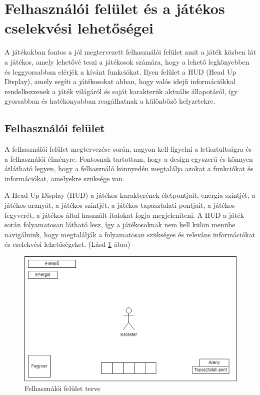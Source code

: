 \section{Felhasználói felület és a játékos cselekvési lehetőségei}

 A játékokban fontos a jól megtervezett felhasználói felület amit a játék közben lát a játékos, amely lehetővé teszi a játékosok számára, hogy a lehető legkönyebben és leggyorsabban elérjék a kívánt funkciókat. Ilyen felület a HUD (Head Up Display), amely segíti a játékosokat abban, hogy valós idejű információkkal rendelkezzenek a játék világáról és saját karakterük aktuális állapotáról, így gyorsabban és hatékonyabban reagálhatnak a különböző helyzetekre.


\subsection{Felhasználói felület}

 A felhasználói felület megtervezése során, nagyon kell figyelni a letisztultságra és a felhasználói élményre. Fontosnak tartottam, hogy a design egyszerű és könnyen átlátható legyen, hogy a felhasználó könnyedén megtalálja azokat a funkciókat és információkat, amelyekre szüksége van.

A Head Up Display (HUD) a játékos karakterének életpontjait, energia szintjét, a játékos aranyát, a játékos szintjét, a játékos tapasztalati pontjait, a játékos fegyverét, a játékos által használt italokat fogja megjeleníteni.
A HUD a játék során folyamatosan látható lesz, így a játékosoknak nem kell külön menübe navigálniuk, hogy megtalálják a folyamatosan szükséges és releváns információkat és cselekvési lehetőségeket. (Lásd \ref{fig:Felhasználói felület} ábra)

\begin{figure}[H]
    \centering
    \includegraphics[width=14.0truecm]{images/MS_UI.drawio.png}
    \caption{Felhasználói felület terve}
    \label{fig:Felhasználói felület}
\end{figure}

